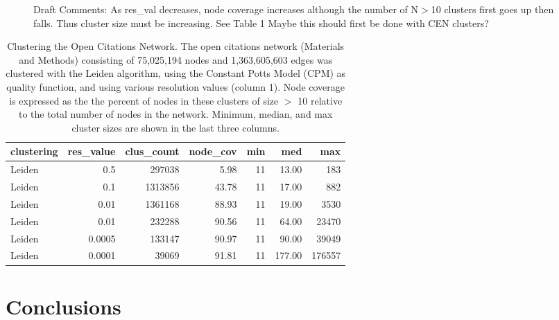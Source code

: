 \documentclass[12pt, oneside]{article}   	%
\begin{document}
	
\begin{figure}[H]
\centering
\begin{subfigure}[t]{0.48\textwidth}
\centering
\end{subfigure}
\hfill
\begin{subfigure}[t]{0.48\textwidth}
\centering
\end{subfigure}
\captionsetup{width=0.9\textwidth}
\caption{Draft Comments: As res\_val decreases, node coverage increases although the number of N$>$10 clusters first goes up then falls. Thus cluster size must be increasing. See Table 1 Maybe this should first be done with CEN clusters?
}
\label{fig:overlapping}
\end{figure}

\begin{table}[ht]
\centering
\begin{tabular}{lrrrrrr}
  \hline
 clustering & res\_value & clus\_count & node\_cov & min & med & max \\ 
  \hline
Leiden & 0.5 & 297038 & 5.98 &  11 & 13.00 & 183 \\ 
Leiden & 0.1 & 1313856 & 43.78 &  11 & 17.00 & 882 \\ 
Leiden & 0.01 & 1361168 & 88.93 &  11 & 19.00 & 3530 \\ 
Leiden & 0.01 & 232288 & 90.56 &  11 & 64.00 & 23470 \\ 
Leiden & 0.0005 & 133147 & 90.97 &  11 & 90.00 & 39049 \\  
Leiden & 0.0001 & 39069 & 91.81 &  11 & 177.00 & 176557 \\ 
   \hline
\end{tabular}
\caption{Clustering the Open Citations Network. The open citations network (Materials and Methods) consisting of 75,025,194 nodes and 1,363,605,603 edges was clustered with the Leiden algorithm, using the Constant Potts Model (CPM) as quality function, and using various resolution values (column 1). Node coverage is expressed as the the percent of nodes in these clusters of size $>$ 10 relative to the total number of nodes in the network. Minimum, median, and max cluster sizes are shown in the last three columns.  }
\end{table}


		
\section{Conclusions}
	
\end{document}
